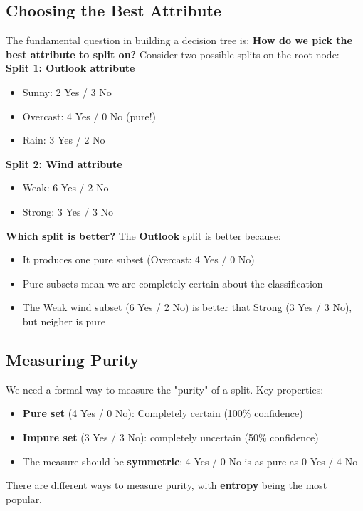 \documentclass[a4paper]{article}
\theoremstyle{definition}
\begin{document}
\subsection{Choosing the Best Attribute}
The fundamental question in building a decision tree is: \textbf{How do we pick the best attribute to split on?}
\vspace{1em}
\noindent 
\newline 
Consider two possible splits on the root node:
\vspace{1em}
\noindent 
\newline 
\textbf{Split 1: Outlook attribute}
\begin{itemize}
    \item Sunny: 2 Yes / 3 No
    \item Overcast: 4 Yes / 0 No (pure!)
    \item Rain: 3 Yes / 2 No
\end{itemize}
\textbf{Split 2: Wind attribute}
\begin{itemize}
    \item Weak: 6 Yes / 2 No 
    \item Strong: 3 Yes / 3 No
\end{itemize}
\textbf{Which split is better?}
\vspace{1em}
\noindent 
\newline 
The \textbf{Outlook} split is better because:
\begin{itemize}
    \item It produces one pure subset (Overcast: 4 Yes / 0 No)
    \item Pure subsets mean we are completely certain about the classification 
    \item The Weak wind subset (6 Yes / 2 No) is better that Strong (3 Yes / 3 No), but neigher is pure
\end{itemize}
\subsection{Measuring Purity}
We need a formal way to measure the "purity" of a split. Key properties:
\begin{itemize}
    \item \textbf{Pure set} (4 Yes / 0 No): Completely certain (100\% confidence)
    \item \textbf{Impure set} (3 Yes / 3 No): completely uncertain (50\% confidence)
    \item The measure should be \textbf{symmetric}: 4 Yes / 0 No is as pure as 0 Yes / 4 No
\end{itemize}
There are different ways to measure purity, with \textbf{entropy} being the most popular.
\end{document}
